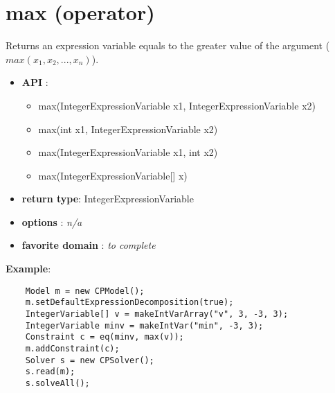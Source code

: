 
\section{max (operator)}\label{max:maxoperator}\hypertarget{max:maxoperator}{}
Returns an expression variable equals to the greater value of the argument (\(max(x_1, x_2, ..., x_n)\)).

\begin{itemize}
	\item \textbf{API} :
	\begin{itemize}
		\item max(IntegerExpressionVariable x1, IntegerExpressionVariable x2)
		\item max(int x1, IntegerExpressionVariable x2)
		\item max(IntegerExpressionVariable x1, int x2)
		\item max(IntegerExpressionVariable[] x)
	\end{itemize}
	\item \textbf{return type}: IntegerExpressionVariable
	\item \textbf{options} : \emph{n/a}
	\item \textbf{favorite domain} : \emph{to complete}
\end{itemize}

\textbf{Example}:
\begin{lstlisting}
	Model m = new CPModel();
	m.setDefaultExpressionDecomposition(true);
	IntegerVariable[] v = makeIntVarArray("v", 3, -3, 3);
	IntegerVariable minv = makeIntVar("min", -3, 3);
	Constraint c = eq(minv, max(v));
	m.addConstraint(c);
	Solver s = new CPSolver();
	s.read(m);
	s.solveAll();
\end{lstlisting}

